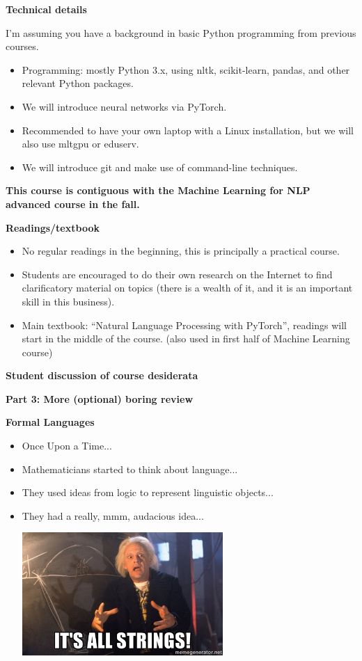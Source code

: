 \documentclass{beamer}
\newcommand{\placard}[1]{
  \begin{frame}
    \begin{center}
      \huge
      \textbf{#1}
    \end{center}
  \end{frame}
}
\newcommand{\pagestepalt}[2]{
  \begin{frame}[t]
    \begin{minipage}[t][0.26\textheight][t]{\textwidth}
      \begin{center}
        \huge
        \textbf{#1}
      \end{center}
    \end{minipage}
    
    \begin{minipage}[t][0.7\textheight][c]{\textwidth}
      #2
    \end{minipage}
  \end{frame}
}
\begin{document}
\pagestepalt{Technical details}{
  I'm assuming you have a background in basic Python programming from previous courses.
  \begin{itemize}
  \item Programming: mostly Python 3.x, using nltk, scikit-learn, pandas, and other relevant Python packages.
  \item We will introduce neural networks via PyTorch.
  \item Recommended to have your own laptop with a Linux installation, but
    we will also use mltgpu or eduserv.
  \item We will introduce git and make use of command-line techniques.
  \end{itemize}
}

\placard{This course is contiguous with the Machine Learning for NLP advanced course in the fall.}

\pagestepalt{Readings/textbook}{
  \begin{itemize}
  \item No regular readings in the beginning, this is principally a practical course.
  \item Students are encouraged to do their own research on the Internet to find clarificatory material on topics (there is a wealth of it, and it is an important skill in this business).
  \item Main textbook: ``Natural Language Processing with PyTorch'', readings will start in the middle of the course. (also used in first half of Machine Learning course)
  \end{itemize}
}

\placard{Student discussion of course desiderata}

\placard{Part 3: More (optional) boring review}

\pagestepalt{Formal Languages}{
  \vspace{-1cm}
\begin{block}{}
\begin{itemize}
	\item Once Upon a Time...
	\pause
	\item Mathematicians started to think about language...
	\pause
	\item They used ideas from logic to represent linguistic objects...
	\pause
	\item They had a really, mmm, audacious idea... \\
	\pause
	\begin{center}
	\includegraphics[width=0.6\textwidth]{../images/doc_brown_strings.jpg}
	\end{center}
\end{itemize}
\end{block}
}
\end{document}
